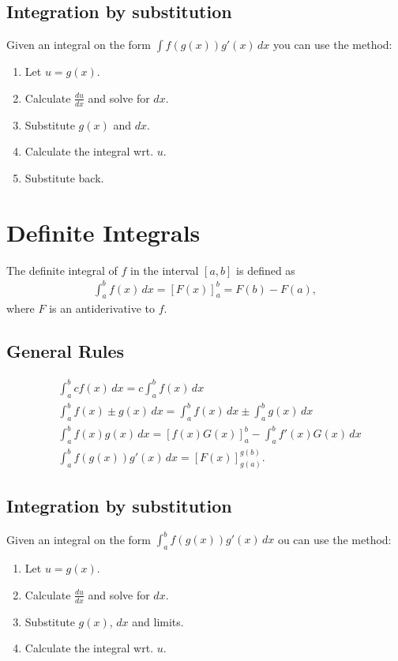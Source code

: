\subsection{Integration by substitution}
Given an integral on the form $\int f(g(x))g'(x)\, dx$ you can use the method:
\begin{enumerate}
	\item Let $u=g(x)$.
	\item Calculate $\frac{du}{dx}$ and solve for $dx$.
	\item Substitute $g(x)$ and $dx$.
	\item Calculate the integral wrt. $u$.
	\item Substitute back.
\end{enumerate}
\section{Definite Integrals}
The definite integral of $f$ in the interval $[a,b]$ is defined as
\begin{align*}
\int_a^b f(x)\, dx =[F(x)]_a^b=F(b)-F(a),
\end{align*}
where $F$ is an antiderivative to $f$.
\subsection{General Rules}
\begin{align*}
&\int_a^b cf(x) \, d x=c\int_a^b f(x)\, dx\\
&\int_a^b \!\!f(x)\pm g(x) \, d x=\int_a^b\!\!f(x)\, dx\pm \int_a^b\!\! g(x) \, dx\\
&\int_a^b\!\!\! \!\!\!f(x)g(x)\, dx\!\!=\!\![f(x)G(x)]_a^b\!\!-\!\!\!\!\int_a^b\!\!\!\!\!\! f'(x)G(x)\, dx\\
&\int_a^b f(g(x))g'(x) \, dx=[F(x)]_{g(a)}^{g(b)}.
\end{align*}
\subsection{Integration by substitution}
Given an integral on the form $\int_a^b f(g(x))g'(x)\, dx$ ou can use the method:
	\begin{enumerate}
	\item Let $u=g(x)$.
	\item Calculate $\frac{du}{dx}$ and solve for $dx$.
	\item Substitute $g(x)$, $dx$ and limits.
	\item Calculate the integral wrt. $u$.
\end{enumerate}